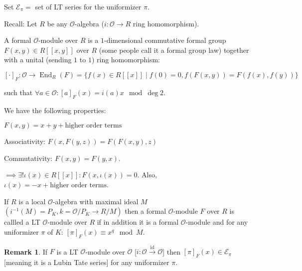 \documentclass{article}
\theoremstyle{definition}
\numberwithin{theorem}{subsection}
\newtheorem*{remark}{Remark}
\begin{document}
    Set \(\mathscr{E}_\pi =\) set of LT series for the uniformizer \(\pi\).

    Recall: Let \(R\) be any \(\mathcal{O}\)-algebra (\(i: \mathcal{O}\to R\) ring homomorphism).

    A formal \(\mathcal{O}\)-module over \(R\) is a \(1\)-dimensional commutative formal group \(F(x,y) \in R[[x,y]]\) over \(R\) (some people call it a formal group law) together with a unital (sending \(1\) to \(1\)) ring homomorphism:

    \[
        [\cdot]_F : \mathcal{O} \to \operatorname{End}_R(F) = \{ f(x) \in R[[x]] \mid f(0)=0, f(F(x,y))=F(f(x),f(y)) \}
    \]

    such that \(\forall a\in \mathcal{O}: [a]_F (x) = i(a)x \mod\deg 2\).

    We have the following properties:

    \(F(x,y) = x + y + \text{higher order terms}\)

    Associativity: \(F(x,F(y,z))=F(F(x,y),z)\)

    Commutativity: \(F(x,y) = F(y,x)\).

    \(\implies\exists! \iota (x) \in R[[x]]: F(x,\iota(x)) = 0\). Also, \(\iota (x) = -x + \text{higher order terms}\).

    If \(R\) is a local \(\mathcal{O}\)-algebra with maximal ideal \(M\) \((i ^{-1} (M) = P_K, k = \mathcal{O} / P_K \to R / M)\) then a formal \(\mathcal{O}\)-module \(F\) over \(R\) is callled a LT \(\mathcal{O}\)-module over \(R\) if in addition it is a formal \(\mathcal{O}\)-module and for any uniformizer \(\pi\) of \(K\): \([\pi]_F (x) \equiv x^q \mod M\).

    \begin{remark}
        If \(F\) is a LT \(\mathcal{O}\)-module over \(\mathcal{O}\) [\(i: \mathcal{O} \xrightarrow{\operatorname{id}} \mathcal{O}\)] then \([\pi]_F (x) \in \mathscr{E}_{\pi}\) [meaning it is a Lubin Tate series] for any uniformizer \(\pi\). 
    \end{remark}
\end{document}
